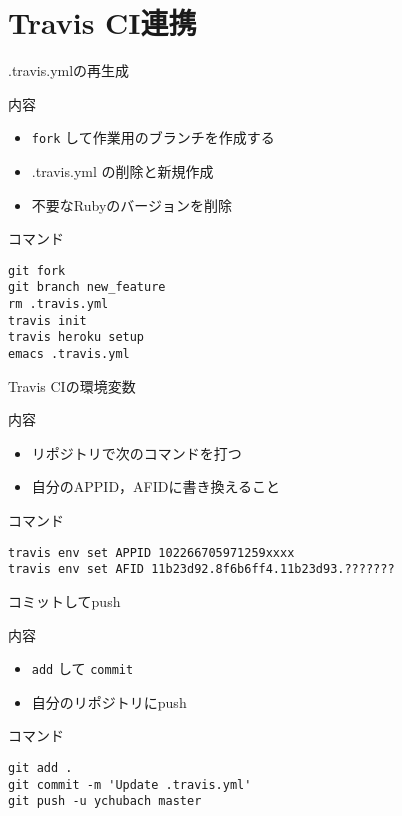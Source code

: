 \documentclass[t]{beamer}
\begin{document}
\section{Travis CI連携}
\label{sec-3}
\begin{frame}[fragile,label=sec-3-1]{.travis.ymlの再生成}
 \begin{block}{内容}
\begin{itemize}
\item \texttt{fork} して作業用のブランチを作成する
\item .travis.yml の削除と新規作成
\item 不要なRubyのバージョンを削除
\end{itemize}
\end{block}
\begin{block}{コマンド}
\begin{verbatim}
git fork
git branch new_feature
rm .travis.yml
travis init
travis heroku setup
emacs .travis.yml
\end{verbatim}
\end{block}
\end{frame}

\begin{frame}[fragile,label=sec-3-2]{Travis CIの環境変数}
 \begin{block}{内容}
\begin{itemize}
\item リポジトリで次のコマンドを打つ
\item 自分のAPPID，AFIDに書き換えること
\end{itemize}
\end{block}
\begin{block}{コマンド}
\begin{verbatim}
travis env set APPID 102266705971259xxxx
travis env set AFID 11b23d92.8f6b6ff4.11b23d93.???????
\end{verbatim}
\end{block}
\end{frame}

\begin{frame}[fragile,label=sec-3-3]{コミットしてpush}
 \begin{block}{内容}
\begin{itemize}
\item \texttt{add} して \texttt{commit}
\item 自分のリポジトリにpush
\end{itemize}
\end{block}
\begin{block}{コマンド}
\begin{verbatim}
git add .
git commit -m 'Update .travis.yml'
git push -u ychubach master
\end{verbatim}
\end{block}
\end{frame}
\end{document}
